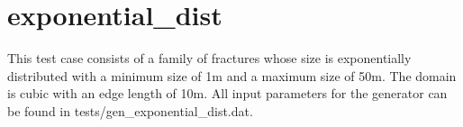 \documentclass[letterpaper,10pt,english]{sphinxmanual}
\begin{document}

\begin{DUlineblock}{0em}
\item[] 
\item[] 
\end{DUlineblock}


\begin{DUlineblock}{0em}
\item[] 
\item[] 
\end{DUlineblock}



\section{exponential\_dist}
\label{\detokenize{tutorial:exponential-dist}}
This test case consists of a family of fractures whose size is exponentially distributed with a minimum size of 1m and a maximum size of 50m. The domain is cubic with an edge length of 10m. All input parameters for the generator can be found in tests/gen\_exponential\_dist.dat.


\begin{DUlineblock}{0em}
\item[] 
\item[] 
\end{DUlineblock}


\begin{DUlineblock}{0em}
\item[] 
\item[] 
\end{DUlineblock}
\end{document}

